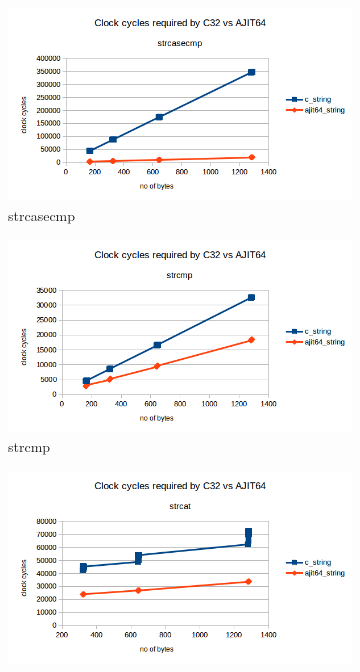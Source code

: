\documentclass[12pt]{article}
\begin{document}
\begin{figure}[H]
     \centering
     \begin{subfigure}[b]{0.4\textwidth}
         \centering
         \includegraphics[width=\textwidth]{strcasecmp.png}
         \caption{strcasecmp}
     \end{subfigure}
     \hfill
     \begin{subfigure}[b]{0.4\textwidth}
         \centering
         \includegraphics[width=\textwidth]{strcmp.png}
         \caption{strcmp}
         \end{subfigure}
     \hfill
     \begin{subfigure}[b]{0.4\textwidth}
         \centering
         \includegraphics[width=\textwidth]{strcat.png}

\end{subfigure}
\end{figure}
\end{document}

